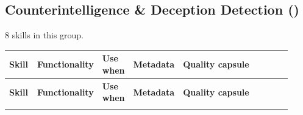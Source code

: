 \documentclass[
]{article}
\renewcommand{\arraystretch}{1.08}
\begin{document}
\subsection{\texorpdfstring{Counterintelligence \& Deception Detection
()}{Counterintelligence & Deception Detection (counterintelligence)}}\label{counterintelligence-deception-detection-counterintelligence}

8 skills in this group.

\begingroup
\scriptsize
\setlength{\tabcolsep}{1.8pt}
\renewcommand{\arraystretch}{1.02}
\begin{longtable}{@{}>{\raggedright\arraybackslash}p{0.105\linewidth}>{\raggedright\arraybackslash}p{0.13\linewidth}>{\raggedright\arraybackslash}p{0.095\linewidth}>{\raggedright\arraybackslash}p{0.135\linewidth}>{\raggedright\arraybackslash}p{0.455\linewidth}@{}}
\toprule
\textbf{Skill} & \textbf{Functionality} & \textbf{Use when} & \textbf{Metadata} & \textbf{Quality capsule}\\
\midrule
\endfirsthead
\toprule
\textbf{Skill} & \textbf{Functionality} & \textbf{Use when} & \textbf{Metadata} & \textbf{Quality capsule}\\
\midrule
\endhead
\bottomrule
\endfoot

\end{longtable}
\end{document}
